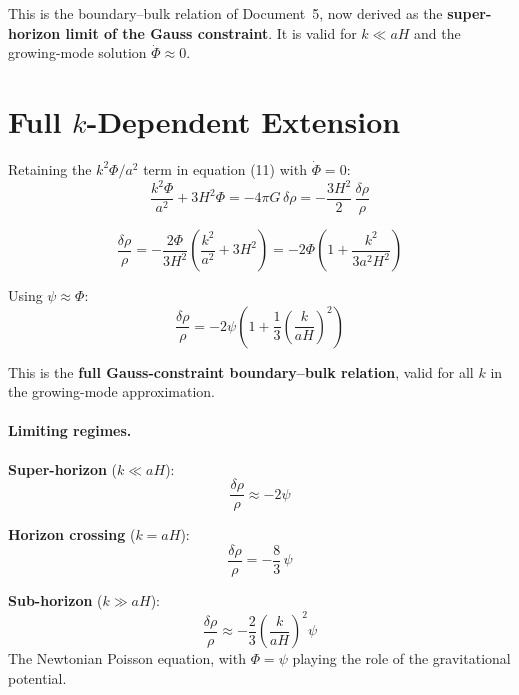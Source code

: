 \documentclass[12pt,a4paper]{article}
\begin{document}
This is the boundary--bulk relation of Document~5, now derived as the \textbf{super-horizon limit of the Gauss constraint}. It is valid for $k \ll aH$ and the growing-mode solution $\dot\Phi \approx 0$.

\section{Full $k$-Dependent Extension}

Retaining the $k^2\Phi/a^2$ term in equation (11) with $\dot\Phi = 0$:
\begin{equation}
\frac{k^2\Phi}{a^2} + 3H^2\Phi = -4\pi G\,\delta\rho = -\frac{3H^2}{2}\,\frac{\delta\rho}{\rho} \tag{18}
\end{equation}

\begin{equation}
\frac{\delta\rho}{\rho} = -\frac{2\Phi}{3H^2}\left(\frac{k^2}{a^2} + 3H^2\right) = -2\Phi\!\left(1 + \frac{k^2}{3a^2H^2}\right) \tag{19}
\end{equation}

Using $\psi \approx \Phi$:
\begin{equation}
\boxed{\frac{\delta\rho}{\rho} = -2\psi\!\left(1 + \frac{1}{3}\left(\frac{k}{aH}\right)^2\right)} \tag{20}
\end{equation}

This is the \textbf{full Gauss-constraint boundary--bulk relation}, valid for all $k$ in the growing-mode approximation.

\paragraph{Limiting regimes.}

\textbf{Super-horizon} ($k \ll aH$):
\begin{equation}
\frac{\delta\rho}{\rho} \approx -2\psi \tag{21}
\end{equation}

\textbf{Horizon crossing} ($k = aH$):
\begin{equation}
\frac{\delta\rho}{\rho} = -\frac{8}{3}\,\psi \tag{22}
\end{equation}

\textbf{Sub-horizon} ($k \gg aH$):
\begin{equation}
\frac{\delta\rho}{\rho} \approx -\frac{2}{3}\!\left(\frac{k}{aH}\right)^2\psi \tag{23}
\end{equation}
The Newtonian Poisson equation, with $\Phi = \psi$ playing the role of the gravitational potential.
\end{document}
